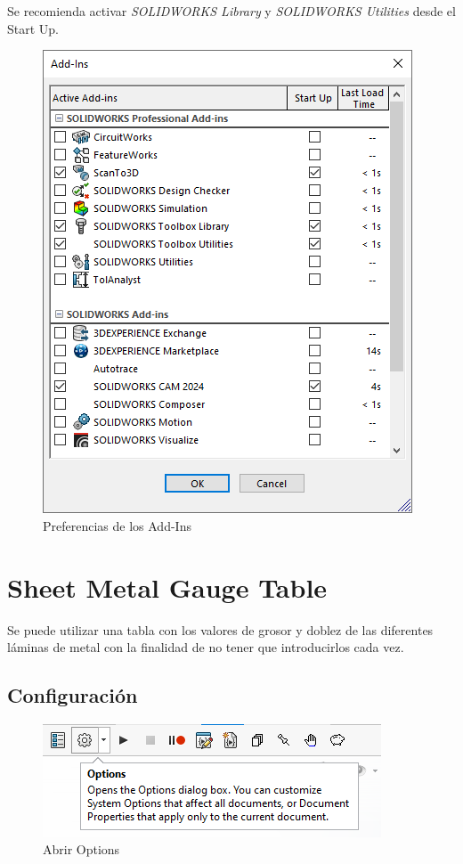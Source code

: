 \documentclass{report}
\begin{document}
Se recomienda activar \emph{SOLIDWORKS Library} y \emph{SOLIDWORKS Utilities} desde el Start Up.

\begin{figure}[H]
	\centering
	\includegraphics[width=0.85\linewidth, height=0.5\textheight,keepaspectratio]{Imagenes/solidworks_addin_02}
	\caption{Preferencias de los Add-Ins}
	\label{fig:solidworksaddin02}
\end{figure}

\chapter{Sheet Metal Gauge Table}

Se puede utilizar una tabla con los valores de grosor y doblez de las diferentes láminas de metal con la finalidad de no tener que introducirlos cada vez. 

\section{Configuración}

\begin{figure}[H]
	\centering
	\includegraphics[width=0.85\linewidth, height=0.5\textheight,keepaspectratio]{Imagenes/solidworks_sheetmetalgauge_01}
	\caption{Abrir Options}
	\label{fig:solidworkssheetmetalgauge01}
\end{figure}
\end{document}
